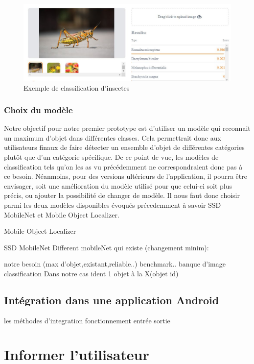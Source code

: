 \documentclass[UTF8]{EPURapport}
\begin{document}
\begin{figure}[h!]
\centering
  \includegraphics[width=\textwidth]{images/insects_classification.jpg}
  \caption{Exemple de classification d'insectes}
  \label{fig:insectsclassification}
\end{figure}

\subsubsection{Choix du modèle} \label{choixmodele}
Notre objectif pour notre premier prototype est d'utiliser un modèle qui reconnait un maximum d'objet dans différentes classes. Cela permettrait donc aux utilisateurs finaux de faire détecter un ensemble d'objet de différentes catégories plutôt que d'un catégorie spécifique. De ce point de vue, les modèles de classification tels qu'on les as vu précédemment ne correspondraient donc pas à ce besoin. Néanmoins, pour des versions ultérieurs de l'application, il pourra être envisager, soit une amélioration du modèle utilisé pour que celui-ci soit plus précis, ou ajouter la possibilité de changer de modèle. Il nous faut donc choisir parmi les deux modèles disponibles évoqués précedemment à savoir SSD MobileNet et Mobile Object Localizer.

Mobile Object Localizer

SSD MobileNet
Different mobileNet qui existe (changement minim): %



notre besoin (max d'objet,existant,reliable..)
benchmark..
banque d'image
classification
Dans notre cas 
ident 1 objet à la X(objet id)
\subsection{Intégration dans une application Android}
les méthodes d'integration
fonctionnement
entrée sortie

\section{Informer l'utilisateur}
\end{document}
